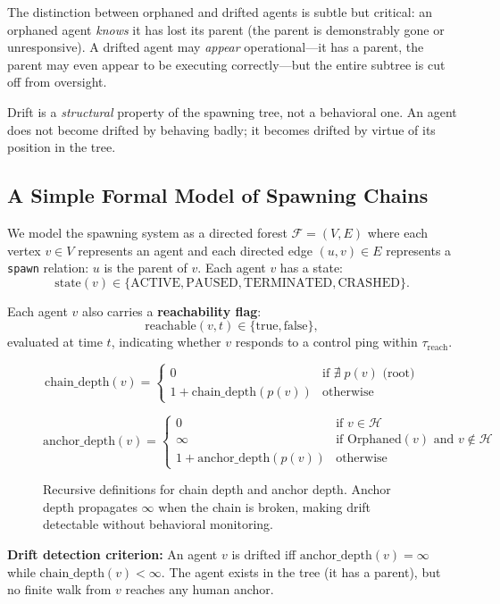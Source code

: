 The distinction between orphaned and drifted agents is subtle but critical: an orphaned agent \emph{knows} it has lost its parent (the parent is demonstrably gone or unresponsive). A drifted agent may \emph{appear} operational—it has a parent, the parent may even appear to be executing correctly—but the entire subtree is cut off from oversight.

Drift is a \emph{structural} property of the spawning tree, not a behavioral one. An agent does not become drifted by behaving badly; it becomes drifted by virtue of its position in the tree.

\subsection{A Simple Formal Model of Spawning Chains}

We model the spawning system as a directed forest $\mathcal{F} = (V, E)$ where each vertex $v \in V$ represents an agent and each directed edge $(u, v) \in E$ represents a \texttt{spawn} relation: $u$ is the parent of $v$. Each agent $v$ has a state:
\[
\text{state}(v) \in \{\text{ACTIVE}, \text{PAUSED}, \text{TERMINATED}, \text{CRASHED}\}.
\]

Each agent $v$ also carries a \textbf{reachability flag}:
\[
\text{reachable}(v, t) \in \{\text{true}, \text{false}\},
\]
evaluated at time $t$, indicating whether $v$ responds to a control ping within $\tau_{\text{reach}}$.

\begin{figure}[h]
\[
\text{chain\_depth}(v) =
\begin{cases}
0 & \text{if } \nexists\; p(v) \text{ (root)} \\
1 + \text{chain\_depth}(p(v)) & \text{otherwise}
\end{cases}
\]

\[
\text{anchor\_depth}(v) =
\begin{cases}
0 & \text{if } v \in \mathcal{H} \\
\infty & \text{if } \text{Orphaned}(v) \text{ and } v \notin \mathcal{H} \\
1 + \text{anchor\_depth}(p(v)) & \text{otherwise}
\end{cases}
\]
\caption{Recursive definitions for chain depth and anchor depth. Anchor depth propagates $\infty$ when the chain is broken, making drift detectable without behavioral monitoring.}
\end{figure}

\textbf{Drift detection criterion:} An agent $v$ is drifted iff $\text{anchor\_depth}(v) = \infty$ while $\text{chain\_depth}(v) < \infty$. The agent exists in the tree (it has a parent), but no finite walk from $v$ reaches any human anchor.

